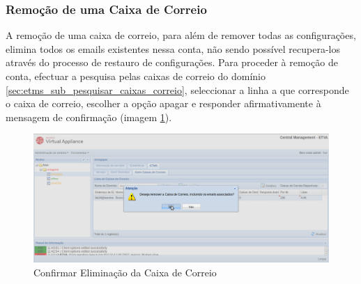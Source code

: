 \subsubsection{Remoção de uma Caixa de Correio}
\label{sec:etms_sub_apagar_caixas_correio}
A remoção de uma caixa de correio, para além de remover todas as configurações, elimina todos os emails existentes nessa conta, não sendo possível recupera-los através do processo de restauro de configurações. Para proceder à remoção de conta, efectuar a pesquisa pelas caixas de correio do domínio \ref{sec:etms_sub_pesquisar_caixas_correio}, seleccionar a linha a que corresponde o caixa de correio, escolher a opção apagar e responder afirmativamente à mensagem de confirmação (imagem \ref{fig:etms_mb_del}).

\begin{figure}[H]
    \begin{center}
    \includegraphics[scale=0.35]{screenshots/etms/etms_mb_del.png}
    \caption{Confirmar Eliminação da Caixa de Correio}
    \label{fig:etms_mb_del}
    \end{center}
\end{figure}
